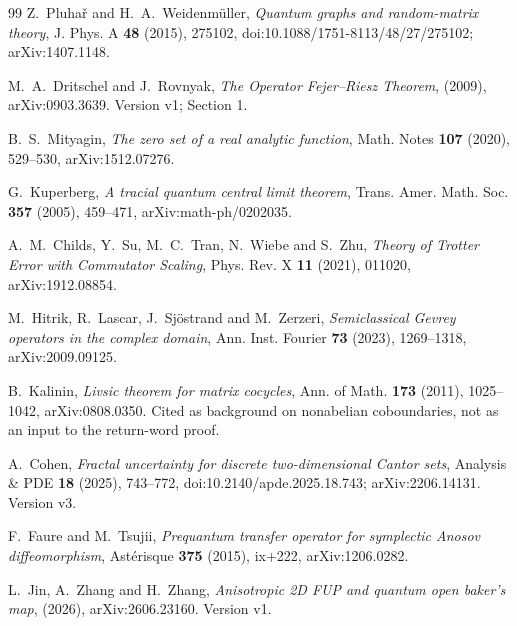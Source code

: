 \begin{thebibliography}{99}
Z.~Pluha\v r and H.~A.~Weidenm\"uller,
\emph{Quantum graphs and random-matrix theory},
J. Phys. A \textbf{48} (2015), 275102,
doi:10.1088/1751-8113/48/27/275102; arXiv:1407.1148.

M.~A.~Dritschel and J.~Rovnyak,
\emph{The Operator Fejer--Riesz Theorem},
(2009),
arXiv:0903.3639.
Version v1; Section 1.

B.~S.~Mityagin,
\emph{The zero set of a real analytic function},
Math. Notes \textbf{107} (2020), 529--530,
arXiv:1512.07276.

G.~Kuperberg,
\emph{A tracial quantum central limit theorem},
Trans. Amer. Math. Soc. \textbf{357} (2005), 459--471,
arXiv:math-ph/0202035.

A.~M.~Childs, Y.~Su, M.~C.~Tran, N.~Wiebe and S.~Zhu,
\emph{Theory of Trotter Error with Commutator Scaling},
Phys. Rev. X \textbf{11} (2021), 011020,
arXiv:1912.08854.

M.~Hitrik, R.~Lascar, J.~Sj\"ostrand and M.~Zerzeri,
\emph{Semiclassical Gevrey operators in the complex domain},
Ann. Inst. Fourier \textbf{73} (2023), 1269--1318,
arXiv:2009.09125.

B.~Kalinin,
\emph{Livsic theorem for matrix cocycles},
Ann. of Math. \textbf{173} (2011), 1025--1042,
arXiv:0808.0350.
Cited as background on nonabelian coboundaries, not as an input to the return-word proof.

A.~Cohen,
\emph{Fractal uncertainty for discrete two-dimensional Cantor sets},
Analysis \& PDE \textbf{18} (2025), 743--772,
doi:10.2140/apde.2025.18.743; arXiv:2206.14131.
Version v3.

F.~Faure and M.~Tsujii,
\emph{Prequantum transfer operator for symplectic Anosov diffeomorphism},
Ast\'erisque \textbf{375} (2015), ix+222,
arXiv:1206.0282.

L.~Jin, A.~Zhang and H.~Zhang,
\emph{Anisotropic 2D FUP and quantum open baker's map},
(2026),
arXiv:2606.23160.
Version v1.

\end{thebibliography}
